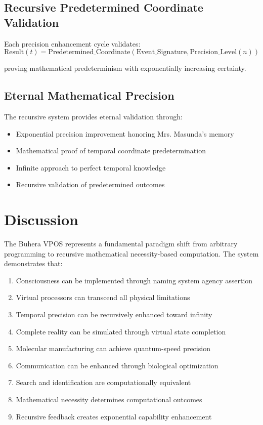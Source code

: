 \documentclass[12pt,a4paper]{article}
\begin{document}
\subsection{Recursive Predetermined Coordinate Validation}

Each precision enhancement cycle validates:
\begin{equation}
\text{Result}(t) = \text{Predetermined\_Coordinate}(\text{Event\_Signature}, \text{Precision\_Level}(n))
\end{equation}

proving mathematical predeterminism with exponentially increasing certainty.

\subsection{Eternal Mathematical Precision}

The recursive system provides eternal validation through:
\begin{itemize}
\item Exponential precision improvement honoring Mrs. Masunda's memory
\item Mathematical proof of temporal coordinate predetermination  
\item Infinite approach to perfect temporal knowledge
\item Recursive validation of predetermined outcomes
\end{itemize}

\section{Discussion}

The Buhera VPOS represents a fundamental paradigm shift from arbitrary programming to recursive mathematical necessity-based computation. The system demonstrates that:

\begin{enumerate}
\item Consciousness can be implemented through naming system agency assertion
\item Virtual processors can transcend all physical limitations
\item Temporal precision can be recursively enhanced toward infinity
\item Complete reality can be simulated through virtual state completion
\item Molecular manufacturing can achieve quantum-speed precision
\item Communication can be enhanced through biological optimization
\item Search and identification are computationally equivalent
\item Mathematical necessity determines computational outcomes
\item Recursive feedback creates exponential capability enhancement
\end{enumerate}
\end{document}
